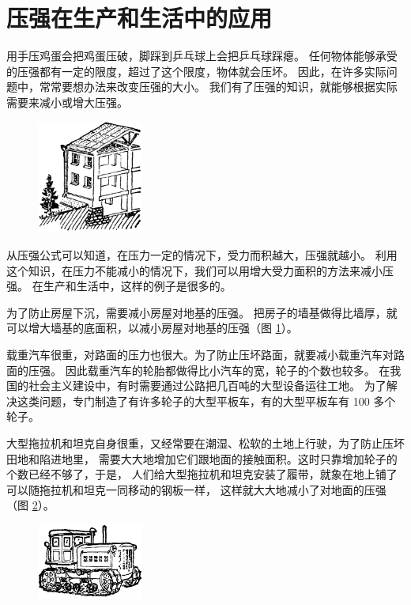 \section{压强在生产和生活中的应用}\label{sec:5-2}

用手压鸡蛋会把鸡蛋压破，脚踩到乒乓球上会把乒乓球踩瘪。
任何物体能够承受的压强都有一定的限度，超过了这个限度，物体就会压坏。
因此，在许多实际问题中，常常要想办法来改变压强的大小。
我们有了压强的知识，就能够根据实际需要来减小或增大压强。

\begin{figure}
    \centering
    \includegraphics[width=3.5cm]{../pic/czwl1-ch5-4}
    \caption{}\label{fig:5-4}
\end{figure}

从压强公式可以知道，在压力一定的情况下，受力而积越大，压强就越小。
利用这个知识，在压力不能减小的情况下，我们可以用增大受力面积的方法来减小压强。
在生产和生活中，这样的例子是很多的。

为了防止房屋下沉，需要减小房屋对地基的压强。
把房子的墙基做得比墙厚，就可以增大墙基的底面积，以减小房屋对地基的压强（图 \ref{fig:5-4}）。

载重汽车很重，对路面的压力也很大。为了防止压坏路面，就要减小载重汽车对路面的压强。
因此载重汽车的轮胎都做得比小汽车的宽，轮子的个数也较多。
在我国的社会主义建设中，有时需要通过公路把几百吨的大型设备运往工地。
为了解决这类问题，专门制造了有许多轮子的大型平板车，有的大型平板车有 100 多个轮子。

大型拖拉机和坦克自身很重，又经常要在潮湿、松软的土地上行驶，为了防止压坏田地和陷进地里，
需要大大地增加它们跟地面的接触面积。这时只靠增加轮子的个数已经不够了，于是，
人们给大型拖拉机和坦克安装了履带，就象在地上铺了可以随拖拉机和坦克一同移动的钢板一样，
这样就大大地减小了对地面的压强（图 \ref{fig:5-5}）。

\begin{figure}
    \centering
    \includegraphics[width=3.5cm]{../pic/czwl1-ch5-5}
    \caption{}\label{fig:5-5}
\end{figure}


